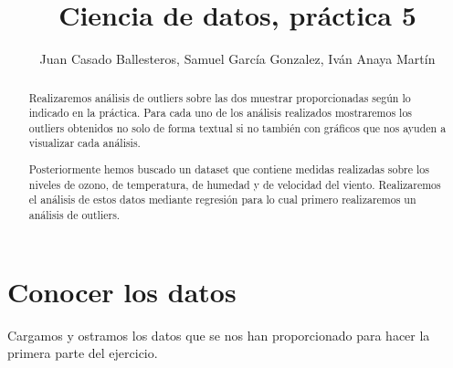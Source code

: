 \documentclass [a4paper] {article}
\title{Ciencia de datos, práctica 5}
\author{Juan Casado Ballesteros, Samuel García Gonzalez, Iván Anaya Martín}
\begin{document}
\maketitle

\begin{abstract}
Realizaremos análisis de outliers sobre las dos muestrar proporcionadas según lo indicado en la práctica.
Para cada uno de los análisis realizados mostraremos los outliers obtenidos no solo de forma textual si no también con gráficos que nos ayuden a visualizar cada análisis.

Posteriormente hemos buscado un dataset que contiene medidas realizadas sobre los niveles de ozono, de temperatura, de humedad y de velocidad del viento.
Realizaremos el análisis de estos datos mediante regresión para lo cual primero realizaremos un análisis de outliers.
\end{abstract}

\newpage

\newpage
\section{Conocer los datos}
Cargamos y ostramos los datos que se nos han proporcionado para hacer la primera parte del ejercicio.
\end{document}

